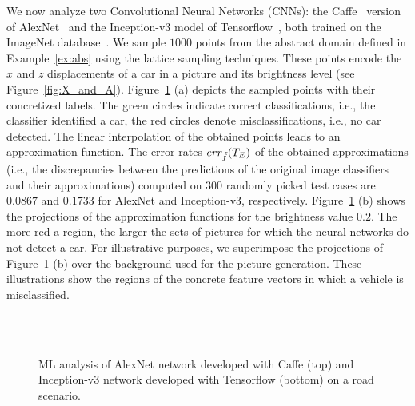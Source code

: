 \begin{example}\label{ex:MLan}

	We now analyze two Convolutional Neural Networks (CNNs):
	the Caffe~\cite{jia2014caffe} version of AlexNet~\cite{krizhevsky2012imagenet} and 
	the Inception-v3 model of Tensorflow~\cite{tensorflow2015},
	both trained on the ImageNet database~\cite{imagenet}.
	We sample $1000$ points from the abstract domain defined in Example~\ref{ex:abs}
	using the lattice sampling techniques.
	These points encode the $x$ and $z$ displacements
	of a car in a picture and its brightness level (see Figure~\ref{fig:X_and_A}).
	Figure~\ref{fig:mlan} (a) depicts the sampled points with their 
	concretized labels. The green circles indicate correct classifications,
	i.e., the classifier identified a car, the red circles denote misclassifications, i.e., no car detected.
	The linear interpolation of the obtained points
	leads to an approximation function. The error rates $err_{\tilde{f}}(T_E)$ of the obtained
	approximations (i.e., the discrepancies between the predictions of the original image classifiers and their approximations)
	computed on $300$ randomly picked test cases are $0.0867$ and $0.1733$
	for AlexNet and Inception-v3, respectively.
	Figure~\ref{fig:mlan} (b) shows the projections of the approximation 
	functions for the brightness value $0.2$. The more red a region, 
	the larger the sets of pictures for which the neural networks do not 
	detect a car. For illustrative purposes, we superimpose the 
	projections of Figure~\ref{fig:mlan} (b) over the background used for the 
	picture generation. These illustrations show the regions of the concrete 
	feature vectors in which a vehicle is misclassified. %
	
	
\begin{figure}
\centering
	\\
	\\
	\caption{ML analysis of AlexNet network developed with Caffe (top) and Inception-v3 network developed with Tensorflow (bottom) on a road scenario.\label{fig:mlan}}
\end{figure}

\end{example}

